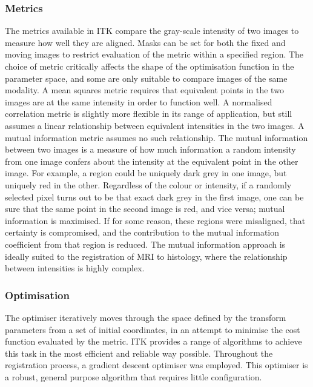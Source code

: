     \subsubsection{Metrics} %
    \label{ssub:metrics}
      The metrics available in ITK compare the gray-scale intensity of two images to measure how well they are aligned. Masks can be set for both the fixed and moving images to restrict evaluation of the metric within a specified region. The choice of metric critically affects the shape of the optimisation function in the parameter space, and some are only suitable to compare images of the same modality. A mean squares metric requires that equivalent points in the two images are at the same intensity in order to function well. A normalised correlation metric is slightly more flexible in its range of application, but still assumes a linear relationship between equivalent intensities in the two images. A mutual information metric assumes no such relationship. The mutual information between two images is a measure of how much information a random intensity from one image confers about the intensity at the equivalent point in the other image. For example, a region could be uniquely dark grey in one image, but uniquely red in the other. Regardless of the colour or intensity, if a randomly selected pixel turns out to be that exact dark grey in the first image, one can be sure that the same point in the second image is red, and vice versa; mutual information is maximised. If for some reason, these regions were misaligned, that certainty is compromised, and the contribution to the mutual information coefficient from that region is reduced. The mutual information approach is ideally suited to the registration of MRI to histology, where the relationship between intensities is highly complex.
  
    \subsubsection{Optimisation} %
    \label{ssub:optimisation}
    The optimiser iteratively moves through the space defined by the transform parameters from a set of initial coordinates, in an attempt to minimise the cost function evaluated by the metric. ITK provides a range of algorithms to achieve this task in the most efficient and reliable way possible. Throughout the registration process, a gradient descent optimiser was employed. This optimiser is a robust, general purpose algorithm that requires little configuration.
